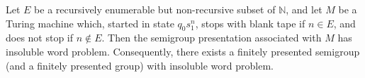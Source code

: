Let $E$ be a recursively enumerable but non-recursive subset of $\mathbb{N}$, and let $M$ be a Turing machine which, started in state $q_0 s_1^n$, stops with blank tape if $n \in E$, and does not stop if $n \notin E$. Then the semigroup presentation associated with $M$ has insoluble word problem. Consequently, there exists a finitely presented semigroup (and a finitely presented group) with insoluble word problem.
